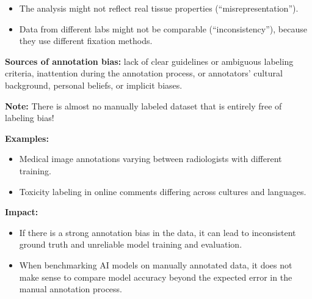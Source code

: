\documentclass{article}
\begin{document}

\begin{itemize}
    \item The analysis might not reflect real tissue properties (“misrepresentation”).
    \item Data from different labs might not be comparable (“inconsistency”), because they use different fixation methods.
\end{itemize}


\textbf{Sources of annotation bias:} lack of clear guidelines or ambiguous labeling criteria, inattention during the annotation process, or annotators’ cultural background, personal beliefs, or implicit biases.

\textbf{Note: }There is almost no manually labeled dataset that is entirely free of labeling bias!

\textbf{Examples:}
\begin{itemize}
    \item Medical image annotations varying between radiologists with different training.
    \item Toxicity labeling in online comments differing across cultures and languages.
\end{itemize}

\textbf{Impact:}
\begin{itemize}
    \item If there is a strong annotation bias in the data, it can lead to inconsistent ground truth and unreliable model training and evaluation.
    \item When benchmarking AI models on manually annotated data, it does not make sense to compare model accuracy beyond the expected error in the manual annotation process.
\end{itemize}
\end{document}
